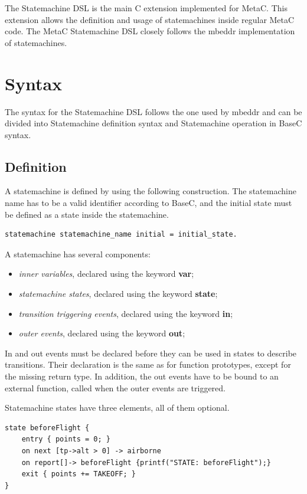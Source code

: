 \documentclass[a4paper,10pt,titlepage]{report}
\begin{document}
The Statemachine DSL is the main C extension implemented for MetaC. This extension allows the definition and usage of statemachines inside regular MetaC code. The MetaC Statemachine DSL closely follows the mbeddr implementation of statemachines.

\section{Syntax}
The syntax for the Statemachine DSL follows the one used by mbeddr and can be divided into Statemachine definition syntax and Statemachine operation in BaseC syntax.
\subsection{Definition}
A statemachine is defined by using the following construction. The statemachine name has to be a valid identifier according to BaseC, and the initial state must be defined as a state inside the statemachine.

\begin{lstlisting}
statemachine statemachine_name initial = initial_state.
\end{lstlisting}

A statemachine has several components:
\begin{itemize}
\item \emph{inner variables}, declared using the keyword \textbf{var};
\item \emph{statemachine states}, declared using the keyword \textbf{state};
\item \emph{transition triggering events}, declared using the keyword \textbf{in};
\item \emph{outer events}, declared using the keyword \textbf{out};
\end{itemize}
 
In and out events must be declared before they can be used in states to describe transitions. Their declaration is the same as for function prototypes, except for the missing return type. In addition, the out events have to be bound to an external function, called when the outer events are triggered.

Statemachine states have three elements, all of them optional.
 
\begin{lstlisting}
state beforeFlight {
    entry { points = 0; }
    on next [tp->alt > 0] -> airborne
    on report[]-> beforeFlight {printf("STATE: beforeFlight");}
    exit { points += TAKEOFF; }
}
\end{lstlisting}
\end{document}
